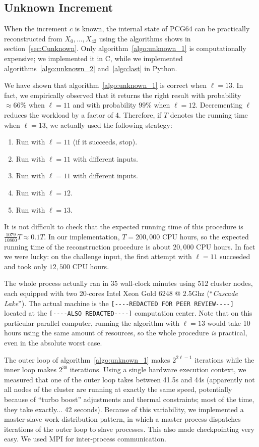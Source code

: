 \documentclass[submission,svgnames,journal=tosc]{iacrtrans}
\begin{document}
\subsection{Unknown Increment}

When the increment $c$ is known, the internal state of \textsf{PCG64} can be
practically reconstructed from $X_0, \dots, X_{42}$ using the algorithms shows
in section~\ref{sec:Cunknown}. Only algorithm~\ref{algo:unknown_1} is
computationally expensive; we implemented it in \textsf{C}, while we implemented
algorithms~\ref{algo:unknown_2} and~\ref{algo:last} in \textsf{Python}.

We have shown that algorithm~\ref{algo:unknown_1} is correct when $\ell=13$. In
fact, we empirically observed that it returns the right result with probability
$\approx 66\%$ when $\ell=11$ and with probability $99\%$ when
$\ell=12$. Decrementing $\ell$ reduces the workload by a factor of 4. Therefore,
if $T$ denotes the running time when $\ell=13$, we actually used the following
strategy:
\begin{enumerate}
\item Run with $\ell=11$ (if it succeeds, stop).
\item Run with $\ell=11$ with different inputs.
\item Run with $\ell=11$ with different inputs.
\item Run with $\ell=12$.
\item Run with $\ell=13$.
\end{enumerate}
It is not difficult to check that the expected running time of this procedure is
$\frac{1079}{10800} T \approx 0.1 T$. In our implementation, $T = 200,000$ CPU
hours, so the expected running time of the reconstruction procedure is about
$20,000$ CPU hours. In fact we were lucky: on the challenge input, the first
attempt with $\ell=11$ succeeded and took only $12,500$ CPU hours.

The whole process actually ran in 35 wall-clock minutes using 512 cluster nodes,
each equipped with two 20-cores \textsf{Intel Xeon Gold 6248 @ 2.5Ghz}
(``\emph{Cascade Lake}''). The actual machine is the
\verb|[----REDACTED FOR PEER REVIEW----]| located at the
\verb|[----ALSO REDACTED----]| computation center. Note that on this particular
parallel computer, running the algorithm with $\ell=13$ would take 10 hours
using the same amount of resources, so the whole procedure \emph{is} practical,
even in the absolute worst case.

The outer loop of algorithm~\ref{algo:unknown_1} makes $2^{2\ell - 1}$
iterations while the inner loop makes $2^{30}$ iterations. Using a single
hardware execution context, we measured that one of the outer loop takes between
41.5s and 44s (apparently not all nodes of the cluster are running at exactly
the same speed, potentially because of ``turbo boost'' adjustments and thermal
constraints; most of the time, they take exactly... 42 seconds). Because of this
variability, we implemented a master-slave work distribution pattern, in which a
master process dispatches iterations of the outer loop to slave processes. This
also made checkpointing very easy. We used \textsf{MPI} for inter-process
communication.
\end{document}
